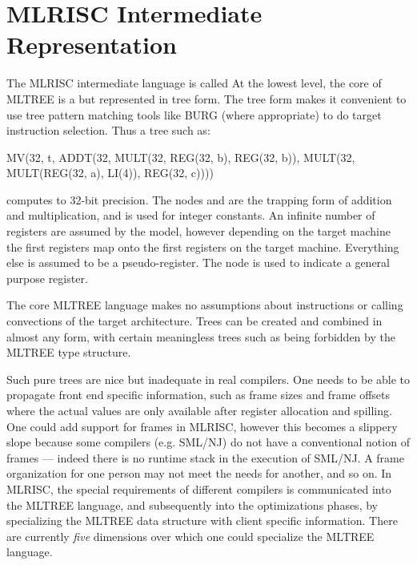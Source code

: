 \section{MLRISC Intermediate Representation}
   The MLRISC intermediate language is called 
    At the lowest level, the core of MLTREE is a 
   but represented in tree form. The tree
   form makes it convenient to use tree pattern matching tools like
   BURG (where appropriate) to do target instruction selection. Thus a
   tree such as: 

   \begin{SML}  
  MV(32, t, 
     ADDT(32, MULT(32, REG(32, b), REG(32, b)),
              MULT(32, MULT(REG(32, a), LI(4)), REG(32, c))))
   \end{SML}

   computes  to 32-bit precision. 
   The nodes  and
    are the trapping form of addition and multiplication,
   and  is used for integer constants. An infinite number
   of registers are assumed by the model, however depending on the
   target machine the first  registers map onto the first
    registers on the target machine. Everything else is
   assumed to be a pseudo-register. The  node is used to
   indicate a  general purpose register. 

   
   The core MLTREE language makes no assumptions about instructions or
   calling convections of the target architecture. Trees can be
   created and combined in almost any form, with certain meaningless
   trees such as  being forbidden by the
   MLTREE type structure.

    Such pure trees are nice but inadequate in real compilers. One
   needs to be able to propagate front end specific information, such
   as frame sizes and frame offsets where the actual values are only
   available after register allocation and spilling. One could add
   support for frames in MLRISC, however this becomes a slippery slope
   because some compilers (e.g. SML/NJ) do not have a conventional
   notion of frames --- indeed there is no runtime stack in the
   execution of SML/NJ. A frame organization for one person may not
   meet the needs for another, and so on.  In MLRISC, the special
   requirements of different compilers is communicated into the MLTREE
   language, and subsequently into the optimizations phases, by
   specializing the MLTREE data structure with client specific
   information. There are currently \emph{five} dimensions over
   which one could specialize the MLTREE language.

